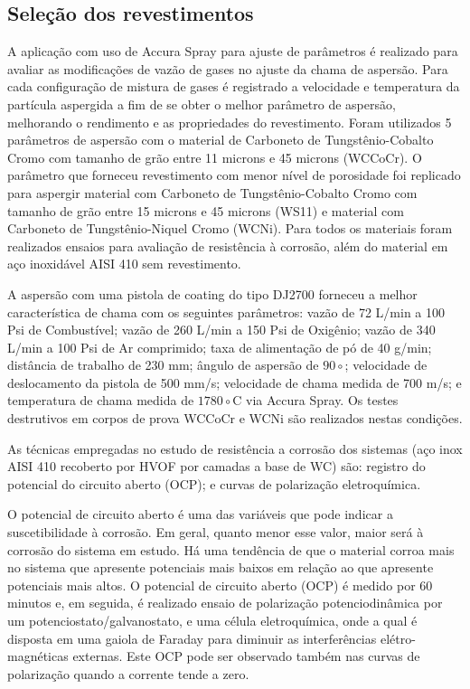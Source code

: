 \subsection{Seleção dos revestimentos}

A aplicação com uso de Accura Spray para ajuste de parâmetros é
realizado para avaliar as modificações de vazão de gases no ajuste da
chama de aspersão. Para cada configuração de mistura de gases é registrado a
velocidade e temperatura da partícula aspergida a fim de se obter o melhor
parâmetro de aspersão, melhorando o rendimento e as propriedades do
revestimento. Foram utilizados 5 parâmetros de aspersão com o material de
Carboneto de Tungstênio-Cobalto Cromo com tamanho de grão entre 11 microns e 45 microns
(WCCoCr). O parâmetro que forneceu revestimento com menor nível de porosidade
foi replicado para aspergir material com Carboneto de Tungstênio-Cobalto Cromo
com tamanho de grão entre 15 microns e 45 microns (WS11) e material com
Carboneto de Tungstênio-Niquel Cromo (WCNi). Para todos os materiais foram
realizados ensaios para avaliação de resistência à corrosão, além do material
em aço inoxidável AISI 410 sem revestimento.

A aspersão com uma pistola de coating do tipo DJ2700 forneceu a
melhor característica de chama com os seguintes parâmetros: vazão de 72 L/min a
100 Psi de Combustível; vazão de 260 L/min a 150 Psi de Oxigênio; vazão de 340
L/min a 100 Psi de Ar comprimido; taxa de alimentação de pó de 40 g/min;
distância de trabalho de 230 mm; ângulo de aspersão de $90\circ$; velocidade de
deslocamento da pistola de 500 mm/s; velocidade de chama medida de 700 m/s; e
temperatura de chama medida de $1780\circ$C via Accura Spray. Os testes
destrutivos em corpos de prova WCCoCr e WCNi são realizados nestas condições.

As técnicas empregadas no estudo de resistência a corrosão dos sistemas (aço
inox AISI 410 recoberto por HVOF por camadas a base de WC) são: registro do
potencial do circuito aberto (OCP); e curvas de polarização eletroquímica. 

O potencial de circuito aberto é uma das variáveis que pode indicar a
suscetibilidade à corrosão. Em geral, quanto menor esse valor, maior será à
corrosão do sistema em estudo. Há uma tendência de que o material corroa mais no
sistema que apresente potenciais mais baixos em relação ao que apresente
potenciais mais altos. O potencial de circuito aberto (OCP) é medido por 60
minutos e, em seguida, é realizado ensaio de polarização potenciodinâmica
por um potenciostato/galvanostato, e uma célula eletroquímica,
onde a qual é disposta em uma gaiola de Faraday para diminuir as interferências
elétro-magnéticas externas. Este OCP pode ser observado também nas curvas
de polarização quando a corrente tende a zero.

